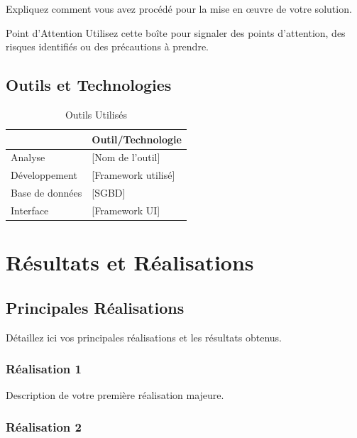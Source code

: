\documentclass{modern-report}
\begin{document}
Expliquez comment vous avez procédé pour la mise en œuvre de votre solution.

\begin{warningbox}{Point d'Attention}
Utilisez cette boîte pour signaler des points d'attention, des risques identifiés ou des précautions à prendre.
\end{warningbox}

\section{Outils et Technologies}

\begin{table}[h]
\centering
\caption{Outils Utilisés}
\begin{tabular}{@{}ll@{}}
\toprule
\moderntablehead{Catégorie & Outil/Technologie} \\
\midrule
Analyse & [Nom de l'outil] \\
Développement & [Framework utilisé] \\
Base de données & [SGBD] \\
Interface & [Framework UI] \\
\bottomrule
\end{tabular}
\end{table}

\chapter{Résultats et Réalisations}

\section{Principales Réalisations}

Détaillez ici vos principales réalisations et les résultats obtenus.

\subsection{Réalisation 1}

Description de votre première réalisation majeure.

\subsection{Réalisation 2}
\end{document}
